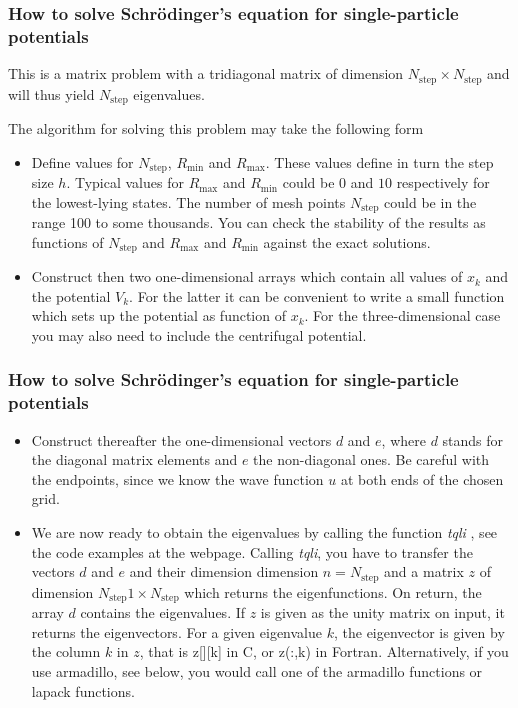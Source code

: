 \documentclass[compress]{beamer}
\begin{document}
\frame
{
  \frametitle{How to solve Schr\"odinger's equation for single-particle potentials}
\begin{small}
{\scriptsize
This is a matrix problem with a tridiagonal matrix of dimension 
$N_{\mathrm{step}} \times N_{\mathrm{step}}$ and will thus yield 
$N_{\mathrm{step}}$ eigenvalues. 

The algorithm for solving this problem  may take the following 
form 
\begin{itemize}
  \item Define values for $N_{\mathrm{step}}$, $R_{\mathrm{min}}$ and $R_{\mathrm{max}}$.
        These values define in turn the step size $h$. Typical values for
        $R_{\mathrm{max}}$ and $R_{\mathrm{min}}$ could be $0$ and $10$ respectively for the lowest-lying states.  
        The number of mesh points $N_{\mathrm{step}}$ could be in the range 100 to some
        thousands. You can check the stability of the results as functions of 
        $N_{\mathrm{step}}$ and $R_{\mathrm{max}}$ and $R_{\mathrm{min}}$
        against the exact solutions. 
  \item Construct then two one-dimensional arrays which contain all values of $x_k$ 
        and the potential $V_k$. For the latter it can be convenient to write a
        small function which sets up the potential as function of $x_k$. For 
        the three-dimensional case you may also need to include 
        the centrifugal potential. 
\end{itemize} 


}
\end{small}
}
\frame
{
  \frametitle{How to solve Schr\"odinger's equation for single-particle potentials}
\begin{small}
{\scriptsize
\begin{itemize}
  \item Construct thereafter the one-dimensional vectors $d$ and $e$, where 
        $d$ stands for the diagonal matrix elements and $e$ the non-diagonal ones.
        Be careful with the endpoints, since we know the wave function $u$ at both ends of the
        chosen grid.   
  \item We are now ready to obtain the eigenvalues by calling the function {\em tqli }, see the code examples
        at the webpage.
        Calling {\em tqli}, you have to transfer the 
        vectors  $d$ and $e$ and their dimension
        dimension $n=N_{\mathrm{step}}$ and a matrix $z$ of dimension
        $N_{\mathrm{step}}1\times N_{\mathrm{step}}$ which returns the eigenfunctions.
        On return, the array $d$ contains the 
        eigenvalues. If $z$ is given as the unity matrix on input, it returns the 
       eigenvectors. For a given eigenvalue $k$, the eigenvector is given by the column
       $k$ in $z$, that is z[][k] in C, or z(:,k) in Fortran. Alternatively, if you use armadillo, see below, you would call one of the armadillo functions or lapack functions.
\end{itemize} 

}
\end{small}
}
\end{document}
